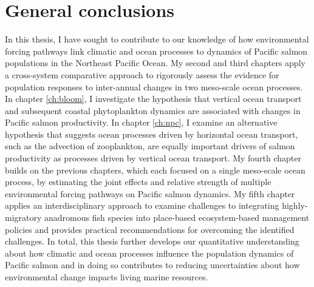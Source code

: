 
\chapter[General conclusions]{General conclusions}
\label{ch:conclude}

In this thesis, I have sought to contribute to our knowledge of how
environmental forcing pathways link climatic and ocean processes to dynamics of
Pacific salmon populations in the Northeast Pacific Ocean. My second and third
chapters apply a cross-system comparative approach to rigorously assess the
evidence for population responses to inter-annual changes in two meso-scale
ocean processes. In chapter \ref{ch:bloom}, I investigate the hypothesis that
vertical ocean transport and subsequent coastal phytoplankton dynamics are
associated with changes in Pacific salmon productivity. In chapter \ref{ch:npc},
I examine an alternative hypothesis that suggests ocean processes driven by
horizontal ocean transport, such as the advection of zooplankton, are equally
important drivers of salmon productivity as processes driven by vertical ocean
transport. My fourth chapter builds on the previous chapters, which each focused
on a single meso-scale ocean process, by estimating the joint effects and
relative strength of multiple environmental forcing pathways on Pacific salmon
dynamics. My fifth chapter applies an interdisciplinary approach to examine
challenges to integrating highly-migratory anadromous fish species into
place-based ecosystem-based management policies and provides practical
recommendations for overcoming the identified challenges. In total, this thesis
further develops our quantitative understanding about how climatic and ocean
processes influence the population dynamics of Pacific salmon and in doing so
contributes to reducing uncertainties about how environmental change impacts
living marine resources.

